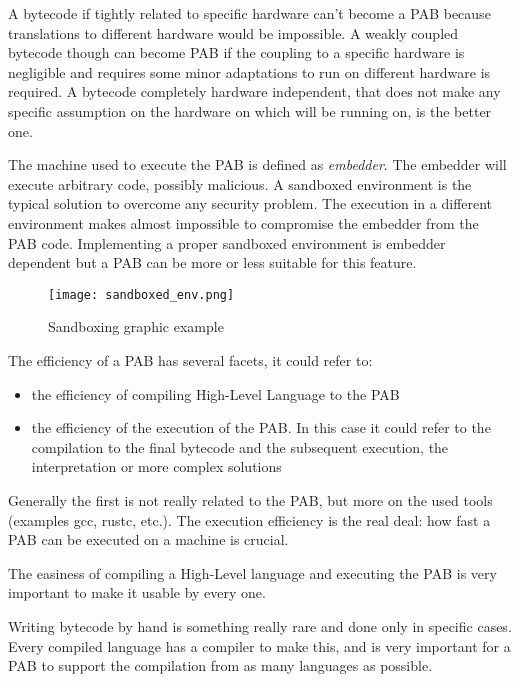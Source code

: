 \documentclass[../main.tex]{subfiles}
\begin{document}
\begin{description}[style=nextline]
  \item[Hardware Independence]
        A bytecode if tightly related to specific hardware can't become a PAB because translations to different hardware would be impossible. A weakly coupled bytecode though can become PAB if the coupling to a specific hardware is negligible and requires some minor adaptations to run on different hardware is required. A bytecode completely hardware independent, that does not make any specific assumption on the hardware on which will be running on, is the better one.
  \item[Sandboxing]
        The machine used to execute the PAB is defined as \textit{embedder}. The embedder will execute arbitrary code, possibly malicious.  A sandboxed environment is the typical solution to overcome any security problem. The execution in a different environment makes almost impossible to compromise the embedder from the PAB code. Implementing a proper sandboxed environment is embedder dependent but a PAB can be more or less suitable for this feature.

        \begin{figure}[h]
          \centering
          \texttt{[image: sandboxed\_env.png]}
          \caption{Sandboxing graphic example}
          \label{fig:Sandboxing graphic example}
        \end{figure}

  \item[Efficiency]
        The efficiency of a PAB has several facets, it could refer to:

        \begin{itemize}
          \item the efficiency of compiling High-Level Language to the PAB
          \item the efficiency of the execution of the PAB. In this case it could refer to the compilation to the final bytecode and the subsequent execution, the interpretation or more complex solutions
        \end{itemize}

        Generally the first is not really related to the PAB, but more on the used tools (examples gcc, rustc, etc.). The execution efficiency is the real deal: how fast a PAB can be executed on a machine is crucial.
  \item[Tool Simplicity]
        The easiness of compiling a High-Level language and  executing the PAB is very important to make it usable by every one.
  \item[Support as Compilation Target]
        Writing bytecode by hand is something really rare and done only in specific cases. Every compiled language has a compiler to make this, and is very important for a PAB to support the compilation from as many languages as possible.
\end{description}
\end{document}
